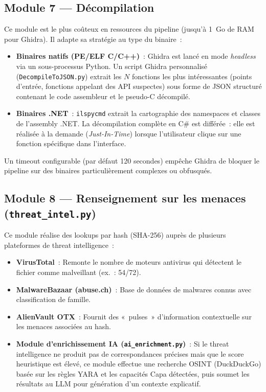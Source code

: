 \subsection{Module 7 --- Décompilation}

Ce module est le plus coûteux en ressources du pipeline (jusqu'à 1~Go de RAM pour Ghidra). Il adapte sa stratégie au type du binaire~:

\begin{itemize}
  \item \textbf{Binaires natifs (PE/ELF C/C++)}~: Ghidra est lancé en mode \textit{headless} via un sous-processus Python. Un script Ghidra personnalisé (\texttt{DecompileToJSON.py}) extrait les $N$ fonctions les plus intéressantes (points d'entrée, fonctions appelant des API suspectes) sous forme de JSON structuré contenant le code assembleur et le pseudo-C décompilé.

  \item \textbf{Binaires .NET}~: \texttt{ilspycmd} extrait la cartographie des namespaces et classes de l'assembly .NET. La décompilation complète en C\# est différée~: elle est réalisée à la demande (\textit{Just-In-Time}) lorsque l'utilisateur clique sur une fonction spécifique dans l'interface.
\end{itemize}

Un timeout configurable (par défaut 120 secondes) empêche Ghidra de bloquer le pipeline sur des binaires particulièrement complexes ou obfusqués.

\subsection{Module 8 --- Renseignement sur les menaces (\texttt{threat\_intel.py})}

Ce module réalise des lookups par hash (SHA-256) auprès de plusieurs plateformes de threat intelligence~:

\begin{itemize}
  \item \textbf{VirusTotal}~: Remonte le nombre de moteurs antivirus qui détectent le fichier comme malveillant (ex.~: 54/72).
  \item \textbf{MalwareBazaar (abuse.ch)}~: Base de données de malwares connus avec classification de famille.
  \item \textbf{AlienVault OTX}~: Fournit des «~pulses~» d'information contextuelle sur les menaces associées au hash.
  \item \textbf{Module d'enrichissement IA (\texttt{ai\_enrichment.py})}~: Si le threat intelligence ne produit pas de correspondances précises mais que le score heuristique est élevé, ce module effectue une recherche OSINT (DuckDuckGo) basée sur les règles YARA et les capacités Capa détectées, puis soumet les résultats au LLM pour génération d'un contexte explicatif.
\end{itemize}

